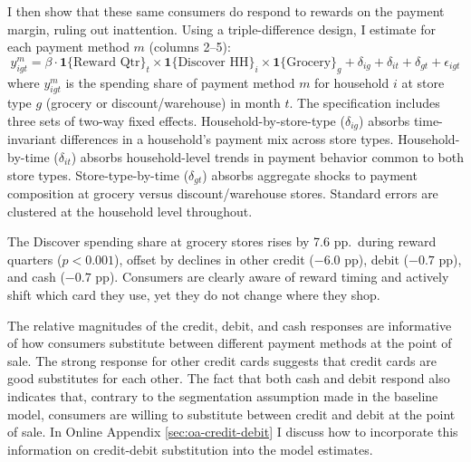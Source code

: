 \documentclass[main.tex]{subfiles}
\begin{document}
I then show that these same consumers do respond to rewards on the payment margin, ruling out inattention.
Using a triple-difference design, I estimate for each payment method $m$ (columns 2--5):
\begin{equation}
    y^m_{igt} = \beta \cdot \mathbf{1}\{\text{Reward Qtr}\}_t \times \mathbf{1}\{\text{Discover HH}\}_i \times \mathbf{1}\{\text{Grocery}\}_g + \delta_{ig} + \delta_{it} + \delta_{gt} + \epsilon_{igt}
\end{equation}
where $y^m_{igt}$ is the spending share of payment method $m$ for household $i$ at store type $g$ (grocery or discount/warehouse) in month $t$.
The specification includes three sets of two-way fixed effects. Household-by-store-type ($\delta_{ig}$) absorbs time-invariant differences in a household's payment mix across store types. Household-by-time ($\delta_{it}$) absorbs household-level trends in payment behavior common to both store types. Store-type-by-time ($\delta_{gt}$) absorbs aggregate shocks to payment composition at grocery versus discount/warehouse stores.
Standard errors are clustered at the household level throughout.

The Discover spending share at grocery stores rises by 7.6 pp.\ during reward quarters ($p < 0.001$), offset by declines in other credit ($-6.0$ pp), debit ($-0.7$ pp), and cash ($-0.7$ pp).
Consumers are clearly aware of reward timing and actively shift which card they use, yet they do not change where they shop.

The relative magnitudes of the credit, debit, and cash responses are informative of how consumers substitute between different payment methods at the point of sale. 
The strong response for other credit cards suggests that credit cards are good substitutes for each other. 
The fact that both cash and debit respond also indicates that, contrary to the segmentation assumption made in the baseline model, consumers are willing to substitute between credit and debit at the point of sale.
In Online Appendix \ref{sec:oa-credit-debit} I discuss how to incorporate this information on credit-debit substitution into the model estimates.

\begin{table}[ht!]
\small
\caption{Effect of Discover cashback rewards on payment composition\label{tab:discover-triple-diff}}
\scriptsize
\centering \resizebox{\textwidth}{!}{}
\end{table}
\end{document}
